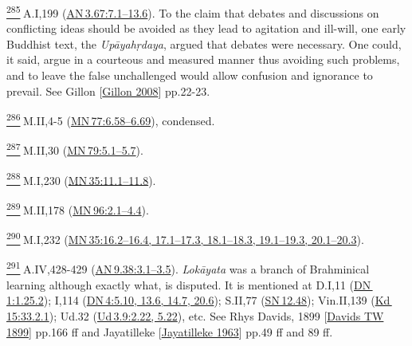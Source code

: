 \label{footprints_split_024.html_fn285}
\hyperref[footprints_split_010.htmlux5cux23fnref285]{\textsuperscript{285}} A.I,199
(\href{https://suttacentral.net/an3.67/en/sujato\#7.1}{AN\,3.67:7.1--13.6}).
To the claim that debates and discussions on conflicting ideas should be
avoided as they lead to agitation and ill-will, one early Buddhist text,
the \emph{Upāyahṛdaya}, argued that debates were necessary. One could,
it said, argue in a courteous and measured manner thus avoiding such
problems, and to leave the false unchallenged would allow confusion and
ignorance to prevail. See {Gillon
{{[}\hyperref[footprints_split_022.htmlux5cux23Gillonux5cux25202008]{Gillon
2008}{]}}} pp.22-23.

\label{footprints_split_024.html_fn286}
\hyperref[footprints_split_010.htmlux5cux23fnref286]{\textsuperscript{286}} M.II,4-5
(\href{https://suttacentral.net/mn77/en/sujato\#6.58}{MN\,77:6.58--6.69}),
condensed.

\label{footprints_split_024.html_fn287}
\hyperref[footprints_split_010.htmlux5cux23fnref287]{\textsuperscript{287}} M.II,30
(\href{https://suttacentral.net/mn79/en/sujato\#5.1}{MN\,79:5.1--5.7}).

\label{footprints_split_024.html_fn288}
\hyperref[footprints_split_010.htmlux5cux23fnref288]{\textsuperscript{288}} M.I,230
(\href{https://suttacentral.net/mn35/en/sujato\#11.1}{MN\,35:11.1--11.8}).

\label{footprints_split_024.html_fn289}
\hyperref[footprints_split_010.htmlux5cux23fnref289]{\textsuperscript{289}} M.II,178
(\href{https://suttacentral.net/mn96/en/sujato\#2.1}{MN\,96:2.1--4.4}).

\label{footprints_split_024.html_fn290}
\hyperref[footprints_split_010.htmlux5cux23fnref290]{\textsuperscript{290}} M.I,232
(\href{https://suttacentral.net/mn35/en/sujato\#16.2}{MN\,35:16.2--16.4,
17.1--17.3, 18.1--18.3, 19.1--19.3, 20.1--20.3}).

\label{footprints_split_024.html_fn291}
\hyperref[footprints_split_010.htmlux5cux23fnref291]{\textsuperscript{291}} A.IV,428-429
(\href{https://suttacentral.net/an9.38/en/sujato\#3.1}{AN\,9.38:3.1--3.5}).
\emph{Lokāyata} was a branch of Brahminical learning although exactly
what, is disputed. It is mentioned at D.I,11
(\href{https://suttacentral.net/dn1/en/sujato\#1.25.2}{DN\,1:1.25.2});
I,114 (\href{https://suttacentral.net/dn4/en/sujato\#5.10}{DN\,4:5.10,
13.6, 14.7, 20.6}); S.II,77
(\href{https://suttacentral.net/sn12.48/en/sujato}{SN\,12.48});
Vin.II,139
(\href{https://suttacentral.net/pli-tv-kd15/en/brahmali\#33.2.1}{Kd\,15:33.2.1});
Ud.32
(\href{https://suttacentral.net/ud3.9/en/sujato\#2.22}{Ud\,3.9:2.22,
5.22}), etc. See {Rhys Davids, 1899
{{[}\hyperref[footprints_split_022.htmlux5cux23Davidsux5cux2520TWux5cux25201899]{Davids
TW 1899}{]}}} pp.166 ff and {Jayatilleke
{{[}\hyperref[footprints_split_022.htmlux5cux23Jayatillekeux5cux25201963]{Jayatilleke
1963}{]}}} pp.49 ff and 89 ff.

